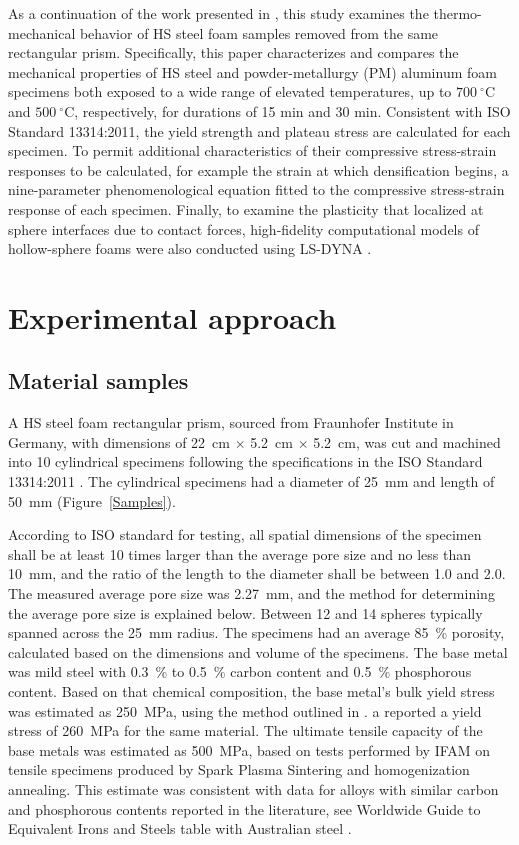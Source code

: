 \documentclass[review]{elsarticle}
\begin{document}
As a continuation of the work presented in \cite{Szyniszewskietal2014}, this study examines the thermo-mechanical behavior of HS steel foam samples removed from the same rectangular prism. Specifically, this paper characterizes and compares the mechanical properties of HS steel and powder-metallurgy (PM) aluminum foam specimens both exposed to a wide range of elevated temperatures, up to $700~^{\circ}\mathrm{C}$ and $500~^{\circ}\mathrm{C}$, respectively, for durations of 15 min and 30 min. Consistent with ISO Standard 13314:2011, the yield strength and plateau stress are calculated for each specimen. To permit additional characteristics of their compressive stress-strain responses to be calculated, for example the strain at which densification begins, a nine-parameter phenomenological equation fitted to the compressive stress-strain response of each specimen. Finally, to examine the plasticity that localized at sphere interfaces due to contact forces, high-fidelity computational models of hollow-sphere foams were also conducted using LS-DYNA \cite{hallquist_ls-dyna_2006}.

\section{Experimental approach}

\subsection*{Material samples}
A HS steel foam rectangular prism, sourced from Fraunhofer Institute in Germany, with dimensions of 22~cm $\times$ 5.2~cm $\times$ 5.2~cm, was cut and machined into 10 cylindrical specimens following the specifications in the ISO Standard 13314:2011 \cite{ISO13314}. The cylindrical specimens had a diameter of 25~mm and length of 50~mm (Figure~\ref{Samples}).

According to ISO standard for testing, all spatial dimensions of the specimen shall be at least 10 times larger than the average pore size and no less than 10~mm, and the ratio of the length to the diameter shall be between 1.0 and 2.0. The measured average pore size was 2.27~mm, and the method for determining the average pore size is explained below. Between 12 and 14 spheres typically spanned across the 25~mm radius. The specimens had an average 85~\% porosity, calculated based on the dimensions and volume of the specimens. The base metal was mild steel with 0.3~\% to 0.5~\% carbon content and 0.5~\% phosphorous content. Based on that chemical composition, the base metal's bulk yield stress was estimated as 250~MPa, using the method outlined in \cite{Cobb1987}. \cite{Smith2012} a reported a yield stress of 260~MPa for the same material. The ultimate tensile capacity of the base metals was estimated as 500~MPa, based on tests performed by IFAM on tensile specimens produced by Spark Plasma Sintering and homogenization annealing. This estimate was consistent with data for alloys with similar carbon and phosphorous contents reported in the literature, see Worldwide Guide to Equivalent Irons and Steels table with Australian steel \cite{Cobb1987}.
\end{document}
